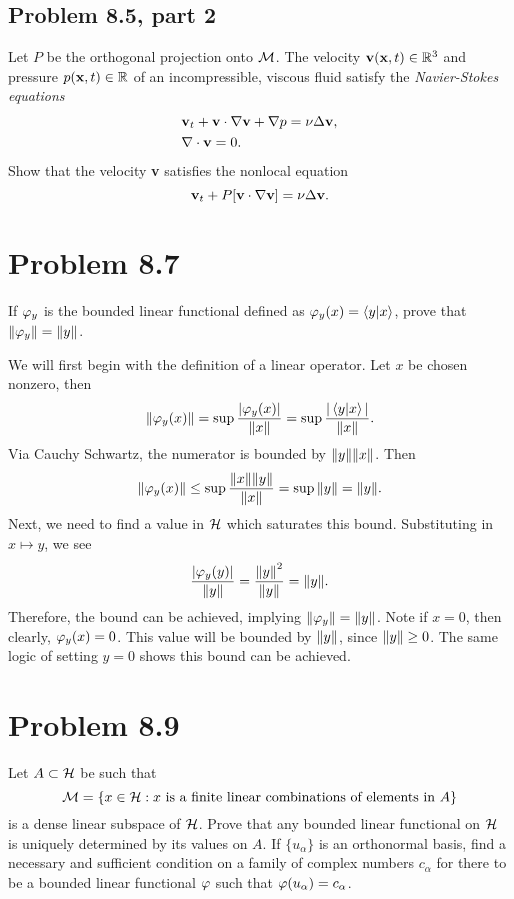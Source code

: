 \newpage
\subsection{Problem 8.5, part 2}
\hop
Let $P$ be the orthogonal projection onto $\mathcal{M}$. The velocity $\textbf{v}(\textbf{x}, t) \in \mathbb{R}^3$ and pressure $p(\textbf{x}, t) \in \mathbb{R}$ of an incompressible, viscous fluid satisfy the \textit{Navier-Stokes equations}
\begin{align*}
    &\textbf{v}_t + \textbf{v} \cdot \nabla \textbf{v} + \nabla p = \nu \Delta \textbf{v},\\
    &\nabla \cdot \textbf{v} = 0.
\end{align*}
Show that the velocity \textbf{v} satisfies the nonlocal equation
\[\textbf{v}_t + P[\textbf{v}\cdot \nabla \textbf{v}] = \nu \Delta \textbf{v}.\]

\newpage
\section{Problem 8.7}
If $\varphi_y$ is the bounded linear functional defined as $\varphi_y (x) = \braket{y}{x}$, prove that $\norm{\varphi_y} = \norm{y}$.
\partbreak
\begin{solution}
    We will first begin with the definition of a linear operator. Let $x$ be chosen nonzero, then 
    \[\norm{\varphi_y(x)} = \sup\frac{|\varphi_y(x)|}{\norm{x}} = \sup\frac{|\braket{y}{x}|}{\norm{x}}.\]
    Via Cauchy Schwartz, the numerator is bounded by $\norm{y}\norm{x}$. Then
    \[\norm{\varphi_y(x)} \leq \sup\frac{\norm{x}\norm{y}}{\norm{x}} = \sup\norm{y} = \norm{y}.\]
    Next, we need to find a value in $\mathcal{H}$ which saturates this bound. Substituting in $x \mapsto y$, we see
    \[\frac{|\varphi_y(y)|}{\norm{y}} = \frac{\norm{y}^2}{\norm{y}} = \norm{y}.\]
    Therefore, the bound can be achieved, implying $\norm{\varphi_y} = \norm{y}$. Note if $x = 0$, then clearly, $\varphi_y(x) = 0$. This value will be bounded by $\norm{y}$, since $\norm{y}\geq 0$. The same logic of setting $y = 0$ shows this bound can be achieved.  
\end{solution}

\newpage
\section{Problem 8.9}
Let $A \subset \mathcal{H}$ be such that
\[\mathcal{M} = \{ x \in \mathcal{H} : x \text{ is a finite linear combinations of elements in $A$}\}\]
is a dense linear subspace of $\mathcal{H}$. Prove that any bounded linear functional on $\mathcal{H}$ is uniquely determined by its values on $A$. If $\{ u_\alpha\}$ is an orthonormal basis, find a necessary and sufficient condition on a family of complex numbers $c_\alpha$ for there to be a bounded linear functional $\varphi$ such that $\varphi(u_\alpha) = c_\alpha$.
